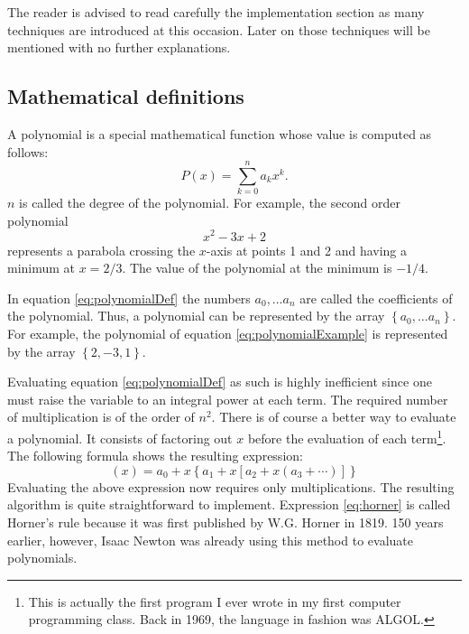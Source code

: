 The reader is advised to read carefully the implementation section as many techniques are introduced at this occasion.
Later on those techniques will be mentioned with no further explanations.

\subsection{Mathematical definitions}
\label{sec:polymath} A polynomial is a special mathematical
function whose value is computed as follows:
\begin{equation}
\label{eq:polynomialDef}P\left(x\right)=\sum_{k=0}^{n}a_k x^k.
\end{equation}
$n$ is called the degree of the polynomial. For example, the
second order polynomial
\begin{equation}
\label{eq:polynomialExample} x^2 -3x + 2
\end{equation}
represents a parabola crossing the $x$-axis at points 1 and 2 and
having a minimum at $x= 2/3$. The value of the polynomial at the
minimum is $-1/4$.

In equation \ref{eq:polynomialDef} the numbers $a_0, \ldots a_n$
are called the coefficients of the polynomial. Thus, a polynomial
can be represented by the array $\left\{ a_0, \ldots a_n
\right\}$. For example, the polynomial of equation
\ref{eq:polynomialExample} is represented by the array $\left\{
2,-3,1 \right\}$.

Evaluating equation \ref{eq:polynomialDef} as such is highly
inefficient since one must raise the variable to an integral power
at each term. The required number of multiplication is of the
order of $n^2$. There is of course a better way to evaluate a
polynomial. It consists of factoring out $x$ before the evaluation
of each term\footnote{This is actually the first program I ever
wrote in my first computer programming class. Back in 1969, the
language in fashion was ALGOL.}. The following formula shows the
resulting expression:
\begin{equation}
\label{eq:horner}
\left(x\right)=a_0+x\left\{a_1+x\left[a_2+x\left(a_3+\cdots\right)\right]\right\}
\end{equation}
Evaluating the above expression now requires only multiplications.
The resulting algorithm is quite straightforward to implement.
Expression \ref{eq:horner} is called Horner's rule because it was
first published by W.G. Horner in 1819. 150 years earlier,
however, Isaac Newton was already using this method to evaluate
polynomials.

